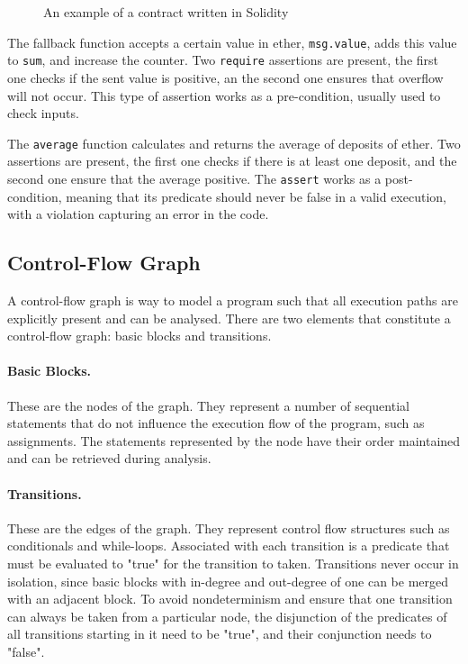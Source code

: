 \begin{figure}

\caption{An example of a contract written in Solidity}
\label{fig:contractC}
\end{figure}

The fallback function accepts a certain value in ether, \texttt{msg.value}, adds this value to \texttt{sum}, and increase the counter. Two \texttt{require} assertions are present, the first one checks if the sent value is positive, an the second one ensures that overflow will not occur. This type of assertion works as a pre-condition, usually used to check inputs.

The \texttt{average} function calculates and returns the average of deposits of ether. Two assertions are present, the first one checks if there is at least one deposit, and the second one ensure that the average positive. The \texttt{assert} works as a post-condition, meaning that its predicate should never be false in a valid execution, with a violation capturing an error in the code.


\subsection{Control-Flow Graph} \label{sec:background_cfg}

A control-flow graph is way to model a program such that all execution paths are explicitly present and can be analysed. There are two elements that constitute a control-flow graph: basic blocks and transitions.

\paragraph{Basic Blocks.} These are the nodes of the graph. They represent a number of sequential statements that do not influence the execution flow of the program, such as assignments. The statements represented by the node have their order maintained and can be retrieved during analysis.

\paragraph{Transitions.} These are the edges of the graph. They represent control flow structures such as conditionals and while-loops. Associated with each transition is a predicate that must be evaluated to "true" for the transition to taken. Transitions never occur in isolation, since basic blocks with in-degree and out-degree of one can be merged with an adjacent block. To avoid nondeterminism and ensure that one transition can always be taken from a particular node, the disjunction of the predicates of all transitions starting in it need to be "true", and their conjunction needs to "false".

